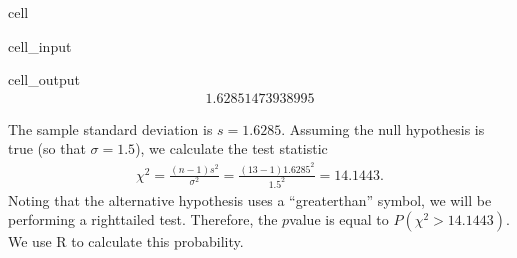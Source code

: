 \documentclass[letterpaper,10pt,english]{jupyterBook}
\begin{document}
\begin{sphinxuseclass}{cell}\begin{sphinxVerbatimInput}

\begin{sphinxuseclass}{cell_input}
\begin{sphinxVerbatim}[commandchars=\\\{\}]
\end{sphinxVerbatim}

\end{sphinxuseclass}\end{sphinxVerbatimInput}
\begin{sphinxVerbatimOutput}

\begin{sphinxuseclass}{cell_output}\begin{equation*}
\begin{split}1.62851473938995\end{split}
\end{equation*}
\end{sphinxuseclass}\end{sphinxVerbatimOutput}

\end{sphinxuseclass}
\sphinxAtStartPar
The sample standard deviation is \(s = 1.6285\). Assuming the null hypothesis is true (so that \(\sigma = 1.5\)), we calculate the test statistic
\begin{equation*}
\begin{split} \chi^2 = \frac{(n - 1)s^2}{\sigma^2} = \frac{(13 - 1)1.6285^2}{1.5^2} = 14.1443. \end{split}
\end{equation*}
\sphinxAtStartPar
Noting that the alternative hypothesis uses a “greater\sphinxhyphen{}than” symbol, we will be performing a right\sphinxhyphen{}tailed test. Therefore, the \(p\)\sphinxhyphen{}value is equal to \(P(\chi^2 > 14.1443)\). We use R to calculate this probability.
\end{document}
